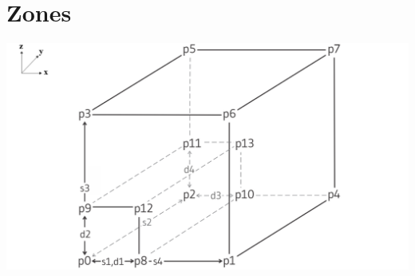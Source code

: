 \documentclass[a4paper, nobind]{templates/ociamthesis}
\begin{document}
\hypertarget{zones}{%
\section{Zones}\label{zones}}

\includegraphics[width=1\linewidth]{myfigureeeeee/final-block-square1}
\end{document}
